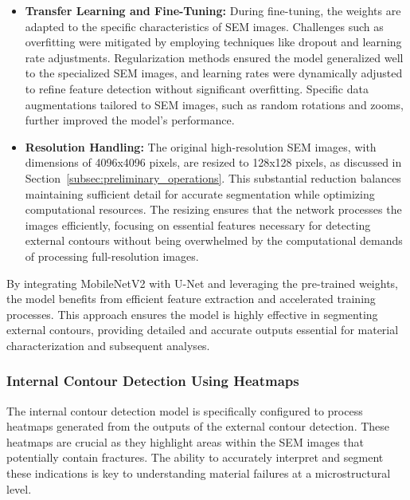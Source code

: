 \documentclass[preprint,12pt]{elsarticle}
\begin{document}
\begin{itemize}
    \item \textbf{Transfer Learning and Fine-Tuning:} During fine-tuning, the weights are adapted to the specific characteristics of SEM images. Challenges such as overfitting were mitigated by employing techniques like dropout and learning rate adjustments. Regularization methods ensured the model generalized well to the specialized SEM images, and learning rates were dynamically adjusted to refine feature detection without significant overfitting. Specific data augmentations tailored to SEM images, such as random rotations and zooms, further improved the model's performance.

    \item \textbf{Resolution Handling:} The original high-resolution SEM images, with dimensions of 4096x4096 pixels, are resized to 128x128 pixels, as discussed in Section~\ref{subsec:preliminary_operations}. This substantial reduction balances maintaining sufficient detail for accurate segmentation while optimizing computational resources. The resizing ensures that the network processes the images efficiently, focusing on essential features necessary for detecting external contours without being overwhelmed by the computational demands of processing full-resolution images.
\end{itemize}

By integrating MobileNetV2 with U-Net and leveraging the pre-trained weights, the model benefits from efficient feature extraction and accelerated training processes. This approach ensures the model is highly effective in segmenting external contours, providing detailed and accurate outputs essential for material characterization and subsequent analyses.

\subsubsection{Internal Contour Detection Using Heatmaps}
The internal contour detection model is specifically configured to process heatmaps generated from the outputs of the external contour detection. These heatmaps are crucial as they highlight areas within the SEM images that potentially contain fractures. The ability to accurately interpret and segment these indications is key to understanding material failures at a microstructural level.
\end{document}
